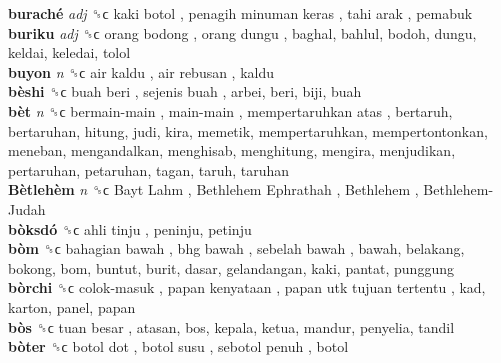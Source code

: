 \textbf{buraché} \emph{adj}  ␝ϲ   kaki botol ,  penagih minuman keras ,  tahi arak , pemabuk  \\
\textbf{buriku} \emph{adj}  ␝ϲ   orang bodong ,  orang dungu , baghal, bahlul, bodoh, dungu, keldai, keledai, tolol  \\
\textbf{buyon} \emph{n}  ␝ϲ   air kaldu ,  air rebusan , kaldu  \\
\textbf{bèshi} ␝ϲ   buah beri ,  sejenis buah , arbei, beri, biji, buah  \\
\textbf{bèt} \emph{n}  ␝ϲ   bermain-main ,  main-main ,  mempertaruhkan atas , bertaruh, bertaruhan, hitung, judi, kira, memetik, mempertaruhkan, mempertontonkan, meneban, mengandalkan, menghisab, menghitung, mengira, menjudikan, pertaruhan, petaruhan, tagan, taruh, taruhan  \\
\textbf{Bètlehèm} \emph{n}  ␝ϲ   Bayt Lahm ,  Bethlehem Ephrathah ,  Bethlehem ,  Bethlehem-Judah   \\
\textbf{bòksdó} ␝ϲ   ahli tinju , peninju, petinju  \\
\textbf{bòm} ␝ϲ   bahagian bawah ,  bhg bawah ,  sebelah bawah , bawah, belakang, bokong, bom, buntut, burit, dasar, gelandangan, kaki, pantat, punggung  \\
\textbf{bòrchi} ␝ϲ   colok-masuk ,  papan kenyataan ,  papan utk tujuan tertentu , kad, karton, panel, papan  \\
\textbf{bòs} ␝ϲ   tuan besar , atasan, bos, kepala, ketua, mandur, penyelia, tandil  \\
\textbf{bòter} ␝ϲ   botol dot ,  botol susu ,  sebotol penuh , botol  \\
